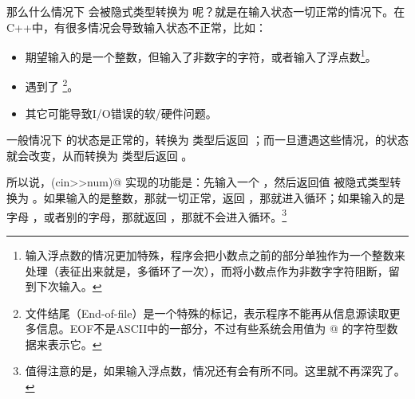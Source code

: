 那么什么情况下 \lstinline@cin@ 会被隐式类型转换为 \lstinline@true@ 呢？就是在输入状态一切正常的情况下。在C++中，有很多情况会导致输入状态不正常，比如：
\begin{itemize}
    \item 期望输入的是一个整数，但输入了非数字的字符，或者输入了浮点数\footnote{输入浮点数的情况更加特殊，程序会把小数点之前的部分单独作为一个整数来处理（表征出来就是，多循环了一次），而将小数点作为非数字字符阻断，留到下次输入。}。
    \item 遇到了 \lstinline@EOF@\footnote{文件结尾（End-of-file）是一个特殊的标记，表示程序不能再从信息源读取更多信息。EOF不是ASCII中的一部分，不过有些系统会用值为 @ 的字符型数据来表示它。}。
    \item 其它可能导致I/O错误的软/硬件问题。
\end{itemize}
一般情况下 \lstinline@cin@ 的状态是正常的，转换为 \lstinline@bool@ 类型后返回 \lstinline@true@；而一旦遭遇这些情况，\lstinline@cin@ 的状态就会改变，从而转换为 \lstinline@bool@ 类型后返回 \lstinline@false@。\par
所以说，\lstinline@while(cin>>num)@ 实现的功能是：先输入一个 \lstinline@num@，然后返回值 \lstinline@cin@ 被隐式类型转换为 \lstinline@bool@。如果输入的是整数，那就一切正常，返回 \lstinline@true@，那就进入循环；如果输入的是字母 \lstinline@q@ ，或者别的字母，那就返回 \lstinline@false@，那就不会进入循环。\footnote{值得注意的是，如果输入浮点数，情况还有会有所不同。这里就不再深究了。}\par
